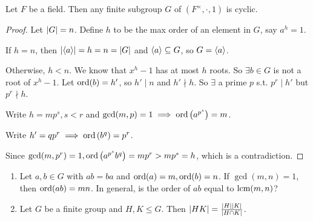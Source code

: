 \begin{theorem}
  Let $F$ be a field. Then any finite subgroup $G$ of $(F^\times, \cdot, 1)$
  is cyclic.

  \begin{proof}
    Let $\lvert G\rvert = n$. Define $h$ to be the max order of an element in $G$,
    say $a^h = 1$.

    If $h = n$, then $\lvert\langle a\rangle\rvert = h = n = \lvert G\rvert$ and $\langle a\rangle \subseteq G$,
    so $G = \langle a\rangle$.

    Otherwise, $h < n$. We know that $x^h - 1$ has at most $h$ roots.
    So $\exists b \in G$ is not a root of $x^h - 1$.
    Let $\operatorname{ord}(b) = h'$, so $h' \mid n$ and $h' \nmid h$.
    So $\exists$ a prime $p$ s.t. $p^r \mid h'$ but $p^r \nmid h$.

    Write $h = mp^s, s < r$ and $\gcd(m, p) = 1 \implies
    \operatorname{ord} \left( a^{p^s} \right) = m$.

    Write $h' = qp^r \implies \operatorname{ord} \left( b^q \right) = p^r$.

    Since $\gcd(m, p^r) = 1, \operatorname{ord}\left(a^{p^s} b^q \right) = mp^r > mp^s = h$,
    which is a contradiction.
  \end{proof}
\end{theorem}

\begin{exercise} \mbox{}
  \begin{enumerate}
    \item Let $a, b \in G$ with $ab = ba$ and $\operatorname{ord}(a) = m, \operatorname{ord}(b) = n$.
      If $\gcd(m, n) = 1$, then $\operatorname{ord}(ab) = mn$.
      In general, is the order of $ab$ equal to $\operatorname{lcm}(m, n)$?
    \item Let $G$ be a finite group and $H, K \le G$. Then
      $\lvert HK\rvert = \frac{\lvert H\rvert\lvert K\rvert}{\lvert H \cap K\rvert}$.
  \end{enumerate}
\end{exercise}
